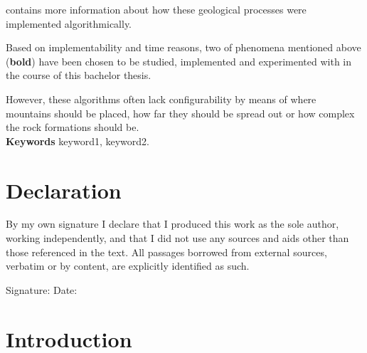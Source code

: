 \documentclass[11pt,a4paper,twoside,openright]{report}
\begin{document}
 contains more information about how these geological processes were implemented algorithmically.

Based on implementability and time reasons, two of phenomena mentioned above (\textbf{bold}) have been chosen to be studied, implemented and experimented with in the course of this bachelor thesis.

However, these algorithms often lack configurability by means of where mountains should be placed, how far they should be spread out or how complex the rock formations should be.
\medskip
\noindent \\\textbf{Keywords} keyword1, keyword2.



\tableofcontents
\listoffigures
\listoftables


\chapter*{Declaration}
By my own signature I declare that I produced this work as the sole author, working independently,
and that I did not use any sources and aids other than those referenced in the text.
All passages borrowed from external sources, verbatim or by content, are explicitly identified as
such.\\

\vspace{15mm}

\noindent Signature: \underline{\hspace{5cm}} \hspace{1cm}  Date: \underline{\hspace{5cm}}


\chapter{Introduction}
\label{sec:intro}
\end{document}
